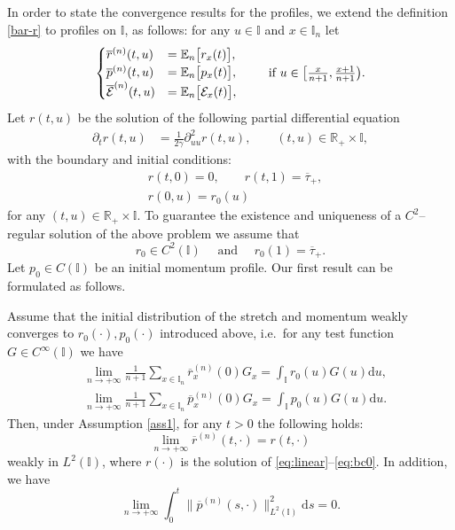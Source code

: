 \documentclass[EJP]{ejpecp} %
\newcommand\bbE{{\mathbb E}}
\newcommand\R{{\mathbb R}}
\newcommand\T{{\mathbb I}}
\newcommand{\dd  }{\mathrm{d}}
\renewcommand{\bar}{\overline}
\numberwithin{equation}{section}
\begin{document}
In order to state the convergence results for the profiles, we
extend the definition \eqref{bar-r} to profiles on
$\T$, as follows: for any $u \in \T$ and $x\in\T_n$ let 
\begin{equation}\label{En0} 
\begin{cases} \bar r^{(n)}(t,u)&=\bbE_n \big[r_x(t)\big], \\
 \bar p^{(n)}(t,u)&=\bbE_n \big[p_x(t)\big],\\
%
\bar{\cal E}^{(n)}(t,u)&=\bbE_n \big[{\cal E}_x(t)\big], \end{cases} \qquad \mbox{ if } u\in \big[ \tfrac x{n+1}, \tfrac{x+1}{n+1} \big). 
\end{equation} 
%
Let $r(t,u)$ be the solution of the following  partial differential equation
    \begin{align}
        \partial_t
        r(t,u)&=\frac{1}{2\gamma}\partial^2_{uu}r(t,u), \qquad  (t,u)\in \R_+\times \T,\label{eq:linear} 
      \end{align}
with the  boundary and initial conditions:
\begin{equation}
  \label{eq:bc0}
  \begin{split}
   & r(t,0) = 0
   , \qquad  r(t,1) = \bar\tau_+,\\
&r(0,u)=r_0(u)
  \end{split}
\end{equation} for any $(t,u)\in \R_+\times \T$.
To guarantee the {existence and uniqueness of a $C^2$--}regular solution of the above problem we
assume that 
\begin{equation}
\label{reg}
r_0\in C^2(\T)\quad\mbox{ and }\quad r_0(1)=\bar \tau_+.
\end{equation}
%
Let $p_0 \in C(\T)$ be an initial momentum profile. Our first result can be formulated as follows.
\begin{theorem}
\label{hydro1}
Assume that the initial distribution of the
  stretch and momentum weakly converges to $r_0(\cdot),p_0(\cdot)$ introduced above,
  i.e.~for any test function $G\in C^\infty(\T)$ we have
\begin{equation}
\label{weak-r0-p0} \begin{aligned}
&\lim_{n\to+\infty}\frac{1}{n+1}\sum_{x\in \T_n}\bar
r_x^{(n)}(0)G_x=\int_{\T}r_0(u)G(u)\dd u,\\
& \lim_{n\to+\infty}\frac{1}{n+1}\sum_{x\in \T_n}\bar
p_x^{(n)}(0)G_x=\int_{\T}p_0(u)G(u)\dd u.
\end{aligned} \end{equation}
Then, under Assumption \ref{ass1},
for any $t>0$ the following holds:
\begin{equation}
\label{hydro-conv}
\lim_{n\to+\infty}\bar r^{(n)}(t,\cdot)=r(t,\cdot)
\end{equation}
weakly in $L^2(\T)$, where $r(\cdot)$ is the solution of
\eqref{eq:linear}--\eqref{eq:bc0}. In addition,
we have
\begin{equation}
\label{hydro-conv1}
\lim_{n\to+\infty}\int_0^t\big\|\bar p^{(n)}(s,\cdot)\big\|^2_{L^2(\T)}\dd s=0.
\end{equation}
\end{theorem}
\end{document}

